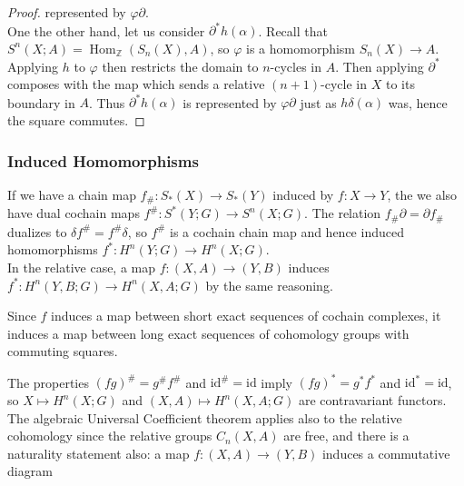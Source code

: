 \documentclass[reqno]{amsart}
\theoremstyle{definition}
\theoremstyle{remark}
\DeclareMathOperator{\Hom}{Hom}
\newcommand{\id}{{\mathrm{id}}}
\begin{document}
\begin{proof}
         represented by $\varphi \partial$.\\
         One the other hand,
         let us consider $\partial^{*} h (\alpha)$.
         Recall that
         $S^{n}(X;A) = 
         \Hom_{\mathbb{Z}}\left( 
         S_n(X), A\right) $, so
         $\varphi $ is a homomorphism
         $S_n(X) \to A$. Applying $h$ to $\varphi $ then
         restricts the domain to  $n$-cycles in
         $A$. Then applying
         $\partial^{*}$ composes with the map
         which sends a relative $(n+1)$-cycle in
         $X$ to its boundary in $A$. Thus
         $\partial^{*} h \left( \alpha \right) $ 
         is represented by
         $\varphi \partial $ just as
         $h \delta (\alpha)$ was, hence the square commutes.

     \end{proof}


     \subsubsection{Induced Homomorphisms}

     If we have a chain map
     $f_{\#} \colon S_{*}(X) \to S_{*}(Y)$ induced
     by $f \colon X \to Y$, the we also have
     dual cochain maps
     $f^{\#}\colon S^{*}(Y;G) \to S^{n}(X;G)$.
     The relation
     $f_{\#} \partial = \partial f_{\#}$ dualizes
     to $\delta f^{\#} = f^{\#} \delta $, so
     $f^{\#}$ is a cochain chain map and hence
     induced homomorphisms
     $f^{*} \colon H^{n}(Y;G) \to H^{n}(X;G)$.\\
     In the relative case, a map
     $f \colon (X,A) \to (Y,B)$ induces
     $f^{*} \colon
     H^{n}(Y,B;G) \to H^{n}(X,A;G)$ by the same reasoning.

     Since $f$ induces a map between short exact
     sequences of cochain complexes, it induces a map between
     long exact sequences of cohomology groups
     with commuting squares.

     The properties
     $(fg)^{\#} = g^{\#} f^{\#}$ and
     $\id^{\#} = \id$ imply
     $\left( fg \right)^{*} = g^{*} f^{*}$ and
     $\id^{*} = \id$, so
     $X \mapsto H^{n}(X;G)$ and
     $(X,A) \mapsto H^{n}(X,A;G)$ are contravariant functors.\\
     \linebreak
     The algebraic Universal Coefficient theorem applies
     also to the relative cohomology since
     the relative groups $C_n (X,A)$ are free, and
     there is a naturality statement also:
     a map $f \colon (X,A) \to (Y,B)$ induces a commutative
     diagram
\end{document}
